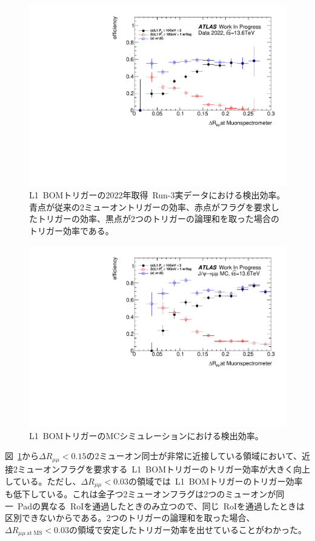 \begin{figure}[H]
    \centering
    \includegraphics[clip, width=12cm]{fig/4/BOM_eff.pdf}
    \caption{L1~BOMトリガーの2022年取得~Run-3実データにおける検出効率。青点が従来の2ミューオントリガーの効率、赤点がフラグを要求したトリガーの効率、黒点が2つのトリガーの論理和を取った場合のトリガー効率である。}
    \label{fig:L1BOMEffData}
\end{figure}

\begin{figure}[H]
    \centering
    \includegraphics[clip, width=12cm]{fig/4/BOM_MC_eff.pdf}
    \caption{L1~BOMトリガーのMCシミュレーションにおける検出効率。}
    \label{fig:L1BOMEffMC}
\end{figure}

図~\ref{fig:L1BOMEffData}から$\Delta R_{\mu\mu}<0.15$の2ミューオン同士が非常に近接している領域において、近接2ミューオンフラグを要求する~L1~BOMトリガーのトリガー効率が大きく向上している。ただし、$\Delta R_{\mu\mu}<0.03$の領域では~L1~BOMトリガーのトリガー効率も低下している。これは金子つ2ミューオンフラグは2つのミューオンが同一~Padの異なる~RoIを通過したときのみ立つので、同じ~RoIを通過したときは区別できないからである。2つのトリガーの論理和を取った場合、$\Delta R_{\mu\mu~\mathrm{at~MS}}<0.03$の領域で安定したトリガー効率を出せていることがわかった。

